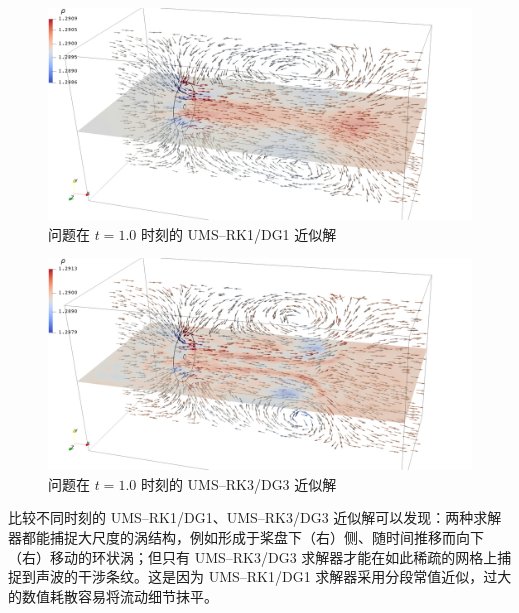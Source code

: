 \begin{figure}[h!]
\begin{centering}
\includegraphics[width=1\textwidth,height=0.26\textheight,keepaspectratio]{figures/upward/p=1/Frame100}
\par\end{centering}
\caption{\label{fig:upward_t=00003D10e-1_p=00003D1}问题在
$t=1.0$ 时刻的 UMS–RK1/DG1 近似解}
\end{figure}

\begin{figure}[h!]
\begin{centering}
\includegraphics[width=1\textwidth,height=0.26\textheight,keepaspectratio]{figures/upward/p=3/Frame100}
\par\end{centering}
\caption{\label{fig:upward_t=00003D10e-1_p=00003D3}问题在
$t=1.0$ 时刻的 UMS–RK3/DG3 近似解}
\end{figure}

比较不同时刻的 UMS–RK1/DG1、UMS–RK3/DG3 近似解可以发现：两种求解器都能捕捉大尺度的涡结构，例如形成于桨盘下（右）侧、随时间推移而向下（右）移动的环状涡；但只有
UMS–RK3/DG3 求解器才能在如此稀疏的网格上捕捉到声波的干涉条纹。这是因为 UMS–RK1/DG1 求解器采用分段常值近似，过大的数值耗散容易将流动细节抹平。


